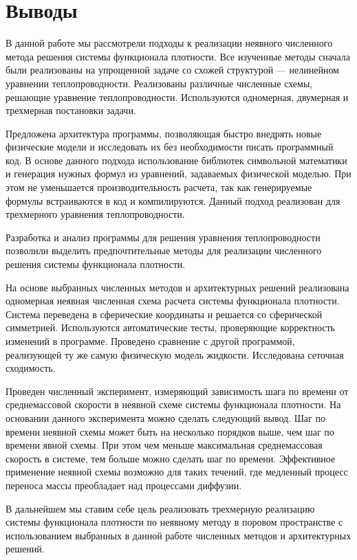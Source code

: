 \documentclass[a4paper,12pt]{article}
\begin{document}





\section{Выводы}
В данной работе мы рассмотрели подходы к реализации неявного численного метода решения системы функционала плотности. Все изученные методы сначала были реализованы на упрощенной задаче со схожей структурой --- нелинейном уравнении теплопроводности. Реализованы различные численные схемы, решающие уравнение теплопроводности. Используются одномерная, двумерная и трехмерная постановки задачи. 
\par
Предложена архитектура программы, позволяющая быстро внедрять новые физические модели и исследовать их без необходимости писать программный код. В основе данного подхода использование библиотек символьной математики и генерация нужных формул из уравнений, задаваемых физической моделью. При этом не уменьшается производительность расчета, так как генерируемые формулы встраиваются в код и компилируются. Данный подход реализован для трехмерного уравнения теплопроводности.
\par
Разработка и анализ программы для решения уравнения теплопроводности позволили выделить предпочтительные методы для реализации численного решения системы функционала плотности.
\par
На основе выбранных численных методов и архитектурных решений реализована одномерная неявная численная схема расчета системы функционала плотности. Система переведена в сферические координаты и решается со сферической симметрией. Используются автоматические тесты, проверяющие корректность изменений в программе. Проведено сравнение с другой программой, реализующей ту же самую физическую модель жидкости. Исследована сеточная сходимость.
\par
Проведен численный эксперимент, измеряющий зависимость шага по времени от среднемассовой скорости в неявной схеме системы функционала плотности. На основании данного эксперимента можно сделать следующий вывод.
Шаг по времени неявной схемы может быть на несколько порядков выше, чем шаг по времени явной схемы. При этом чем меньше максимальная среднемассовая скорость в системе, тем больше можно сделать шаг по времени. Эффективное применение неявной схемы возможно для таких течений, где медленный процесс переноса массы преобладает над процессами диффузии.
\par
В дальнейшем мы ставим себе цель реализовать трехмерную реализацию системы функционала плотности по неявному методу в поровом пространстве с использованием выбранных в данной работе численных методов и архитектурных решений.

\newpage

\end{document}
